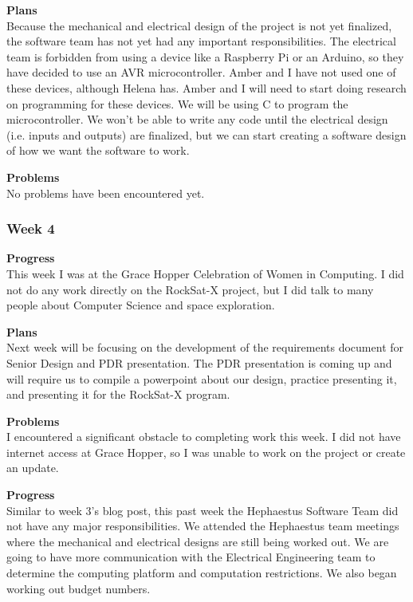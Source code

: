 \textbf{Plans} \\
Because the mechanical and electrical design of the project is not yet finalized, the software team has not yet had any important responsibilities. The electrical team is forbidden from using a device like a Raspberry Pi or an Arduino, so they have decided to use an AVR microcontroller. Amber and I have not used one of these devices, although Helena has. Amber and I will need to start doing research on programming for these devices. We will be using C to program the microcontroller. We won't be able to write any code until the electrical design (i.e. inputs and outputs) are finalized, but we can start creating a software design of how we want the software to work.

\textbf{Problems} \\
No problems have been encountered yet.

\subsubsection{Week 4}
\textbf{Progress} \\
This week I was at the Grace Hopper Celebration of Women in Computing. I did not do any work directly on the RockSat-X project, but I did talk to many people about Computer Science and space exploration.

\textbf{Plans} \\
Next week will be focusing on the development of the requirements document for Senior Design and PDR presentation. The PDR presentation is coming up and will require us to compile a powerpoint about our design, practice presenting it, and presenting it for the RockSat-X program.

\textbf{Problems} \\
I encountered a significant obstacle to completing work this week. I did not have internet access at Grace Hopper, so I was unable to work on the project or create an update.

\textbf{Progress} \\
Similar to week 3's blog post, this past week the Hephaestus Software Team did not have any major responsibilities. We attended the Hephaestus team meetings where the mechanical and electrical designs are still being worked out. We are going to have more communication with the Electrical Engineering team to determine the computing platform and computation restrictions. We also began working out budget numbers.

